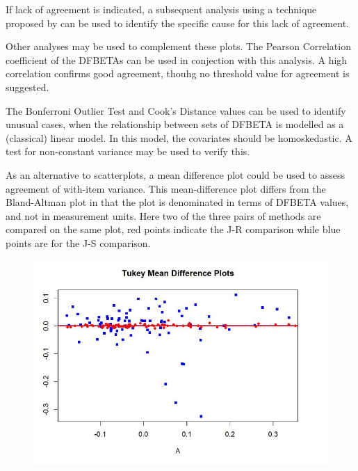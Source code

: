 \documentclass[12pt, a4paper]{report}
\theoremstyle{plain}
\theoremstyle{definition}
\theoremstyle{remark}
\begin{document}
	If lack of agreement is indicated, a subsequent analysis using a technique proposed by \citet{ARoy2009} can be used to identify the specific cause for this lack of agreement.
	
	Other analyses may be used to complement these plots. The Pearson Correlation coefficient of the DFBETAs can be used in conjection with this analysis. A high correlation confirms good agreement, thouhg no threshold value for agreement is suggested.
	
	The Bonferroni Outlier Test and Cook's Distance values can be used to identify unusual cases, when the relationship between sets of DFBETA is modelled as a (classical) linear model. In this model, the covariates should be homoskedastic. A test for non-constant variance may be used to verify this. 
	
	
	As an alternative to scatterplots, a mean difference plot could be used to assess agreement of with-item variance. This mean-difference plot differs from the Bland-Altman plot in that the plot is denominated in terms of DFBETA values, and not in measurement units. Here two of the three pairs of methods are compared on the same plot, red points indicate the J-R comparison while blue points are for the J-S comparison.
	
	\begin{figure}[h!
		]
		\centering
		\includegraphics[width=0.7\linewidth]{images/04-TMDplot}
		
	\end{figure}
	


			
			
			
\end{document}
